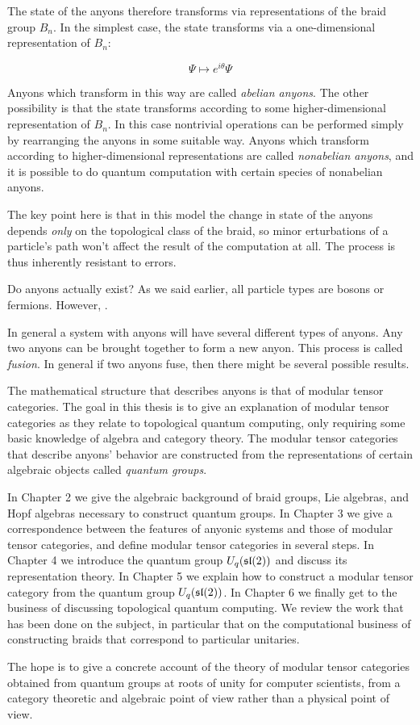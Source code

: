 The state of the anyons therefore transforms via representations of the braid
group $B_n$. In the simplest case, the state transforms via a one-dimensional
representation of $B_n$:

\begin{equation}
\Psi \mapsto e^{i\theta}\Psi
\end{equation}

Anyons which transform in this way are called \emph{abelian anyons}. The other
possibility is that the state transforms according to some higher-dimensional
representation of $B_n$. In this case nontrivial operations can be performed
simply by rearranging the anyons in some suitable way. Anyons which transform
according to higher-dimensional representations are called \emph{nonabelian
anyons}, and it is possible to do quantum computation with certain species
of nonabelian anyons.

The key point here is that in this model the change in state of the anyons
depends \emph{only} on the topological class of the braid, so minor
erturbations of a particle's path won't affect the result of the computation at
all. The process is thus inherently resistant to errors. 

Do anyons actually exist? As we said earlier, all particle types are bosons or
fermions. However, .

In general a system with anyons will have several different types of anyons.
Any two anyons can be brought together to form a new anyon. This process is
called \emph{fusion}. In general if two anyons fuse, then there might be
several possible results. 

The mathematical structure that describes anyons is that of modular tensor
categories. The goal in this thesis is to give an explanation of modular tensor
categories as they relate to topological quantum computing, only requiring some
basic knowledge of algebra and category theory. The modular tensor categories
that describe anyons' behavior are constructed from the representations of
certain algebraic objects called \emph{quantum groups}.



In Chapter 2 we give the algebraic background of braid groups, Lie algebras,
and Hopf algebras necessary to construct quantum groups. In Chapter 3 we give a
correspondence between the features of anyonic systems and those of modular
tensor categories, and define modular tensor categories in several steps.  In
Chapter 4 we introduce the quantum group $U_q(\mathfrak{sl}(2))$ and discuss its
representation theory. In
Chapter 5 we explain how to construct a modular tensor category from the
quantum group $U_q(\mathfrak{sl}(2))$. In Chapter 6 we finally get to the business of
discussing topological quantum computing. We review the work that has been done
on the subject, in particular that on the computational business of
constructing braids that correspond to particular unitaries. 

The hope is to give a concrete account of the theory of modular tensor
categories obtained from quantum groups at roots of unity for computer
scientists, from a category theoretic and algebraic point of view rather than a
physical point of view. 

